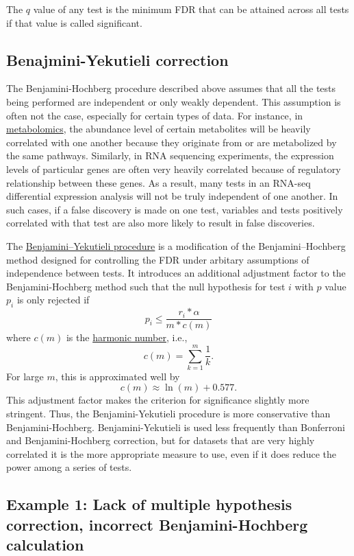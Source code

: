 \documentclass[letterpaper, 12pt]{article}
\begin{document}
The $q$ value of any test is the minimum FDR that can be attained across all tests if that value is called significant.

\subsection*{Benajmini-Yekutieli correction}

The Benjamini-Hochberg procedure described above assumes that all the tests being performed are independent or only weakly dependent. This assumption is often not the case, especially for certain types of data. For instance, in \href{https://en.wikipedia.org/wiki/Metabolomics}{metabolomics}, the abundance level of certain metabolites will be heavily correlated with one another because they originate from or are metabolized by the same pathways. Similarly, in RNA sequencing experiments, the expression levels of particular genes are often very heavily correlated because of regulatory relationship between these genes. As a result, many tests in an RNA-seq differential expression analysis will not be truly independent of one another. In such cases, if a false discovery is made on one test, variables and tests positively correlated with that test are also more likely to result in false discoveries.

The \href{https://doi.org/10.1214%2Faos%2F1013699998}{Benjamini–Yekutieli procedure} is a modification of the Benjamini–Hochberg method designed for controlling the FDR under arbitary assumptions of independence between tests. It introduces an additional adjustment factor to the Benjamini-Hochberg method such that the null hypothesis for test $i$ with $p$ value $p_i$ is only rejected if
$$p_i \leq \frac{r_i * \alpha}{m*c(m)}$$
where $c(m)$ is the \href{https://en.wikipedia.org/wiki/Harmonic_number}{harmonic number}, i.e.,
$$c(m) = \sum_{k=1}^m \frac{1}{k}.$$
For large $m$, this is approximated well by
$$c(m) \approx \ln(m) + 0.577.$$
This adjustment factor makes the criterion for significance slightly more stringent. Thus, the Benjamini-Yekutieli procedure is more conservative than Benjamini-Hochberg. Benjamini-Yekutieli is used less frequently than Bonferroni and Benjamini-Hochberg correction, but for datasets that are very highly correlated it is the more appropriate measure to use, even if it does reduce the power among a series of tests.

\subsection*{Example 1: Lack of multiple hypothesis correction, incorrect Benjamini-Hochberg calculation}
\end{document}
